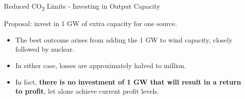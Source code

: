 \documentclass{beamer}
\begin{document}
    \begin{frame}{Reduced CO\textsubscript{2} Limits - Investing in Output Capacity}
    
        Proposal: invest in 1 GW of extra capacity for one source.
        
        	\pause
    
              \begin{itemize}

                  \item The best outcome arises from adding the 1 GW to wind capacity, closely followed by nuclear.
                  
                  \pause

                  \item In either case, losses are approximately halved to  million.
                  
                  \pause

                  \item {}  In fact, \textbf{there is no investment of 1 GW that will result in a return to profit}, let alone achieve current profit levels.

              \end{itemize}
        
    \end{frame}
    
    
\end{document}
